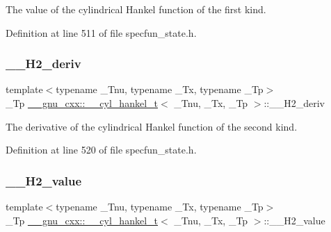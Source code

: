 The value of the cylindrical Hankel function of the first kind. 



Definition at line 511 of file specfun\+\_\+state.\+h.

\mbox{\label{struct____gnu__cxx_1_1____cyl__hankel__t_aac63a9d78d5e3ee6520073963da4cbbb}} 
\subsubsection{\texorpdfstring{\+\_\+\+\_\+\+H2\+\_\+deriv}{\_\_H2\_deriv}}
{\footnotesize\ttfamily template$<$typename \+\_\+\+Tnu, typename \+\_\+\+Tx, typename \+\_\+\+Tp$>$ \\
\+\_\+\+Tp \hyperlink{struct____gnu__cxx_1_1____cyl__hankel__t}{\+\_\+\+\_\+gnu\+\_\+cxx\+::\+\_\+\+\_\+cyl\+\_\+hankel\+\_\+t}$<$ \+\_\+\+Tnu, \+\_\+\+Tx, \+\_\+\+Tp $>$\+::\+\_\+\+\_\+\+H2\+\_\+deriv}



The derivative of the cylindrical Hankel function of the second kind. 



Definition at line 520 of file specfun\+\_\+state.\+h.

\mbox{\label{struct____gnu__cxx_1_1____cyl__hankel__t_a968496d4d370d39f2034657f32860faa}} 
\subsubsection{\texorpdfstring{\+\_\+\+\_\+\+H2\+\_\+value}{\_\_H2\_value}}
{\footnotesize\ttfamily template$<$typename \+\_\+\+Tnu, typename \+\_\+\+Tx, typename \+\_\+\+Tp$>$ \\
\+\_\+\+Tp \hyperlink{struct____gnu__cxx_1_1____cyl__hankel__t}{\+\_\+\+\_\+gnu\+\_\+cxx\+::\+\_\+\+\_\+cyl\+\_\+hankel\+\_\+t}$<$ \+\_\+\+Tnu, \+\_\+\+Tx, \+\_\+\+Tp $>$\+::\+\_\+\+\_\+\+H2\+\_\+value}




